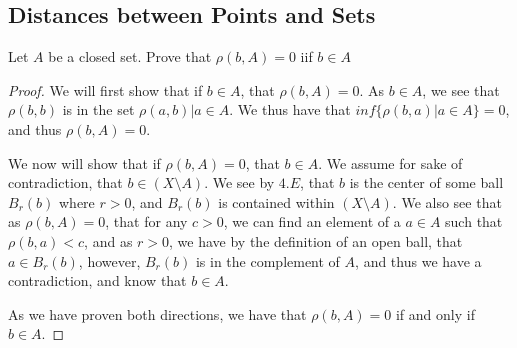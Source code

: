 \subsection{Distances between Points and Sets}

\begin{majorEx}
  Let $A$ be a closed set. Prove that $\rho(b,A)=0$ iif $b\in A$
\end{majorEx}

\begin{proof}
  We will first show that if $b\in A$, that $\rho(b,A)=0$. As $b\in A$, we see 
  that $\rho(b,b)$ is in the set $\rho(a,b) | a \in A$. We thus have that 
  $inf \{ \rho(b,a)| a\in A\}=0$, and thus $\rho(b,A)=0$.

  We now will show that if $\rho(b,A)=0$, that $b\in A$. We assume for sake 
  of contradiction, that $b \in (X \setminus A)$. We see by $4.E$, 
  that $b$ is the center of some ball $B_r(b)$ where $r>0$, and $B_r(b)$ is 
  contained within $(X \setminus A)$. We also see that as $\rho(b,A)=0$, that for any $c>0$, we can find an element of a $a\in A$ such that $\rho(b,a)<c$, and as $r>0$, we have by the definition of an open ball, that $a\in B_r(b)$, however, $B_r(b)$ is in the complement of $A$, and thus we have a contradiction, and know that $b\in A$.
  
  As we have proven both directions, we have that $\rho(b,A) =0$ if and only if $b\in A$.
\end{proof}
